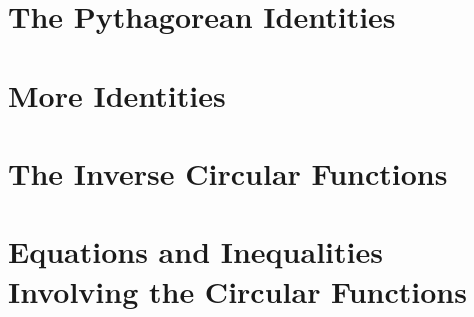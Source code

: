 \section{The Pythagorean Identities}



\newpage

\section{More Identities}



\newpage

\section{The Inverse Circular Functions}



\newpage

\section{Equations and Inequalities Involving the Circular Functions}



\newpage